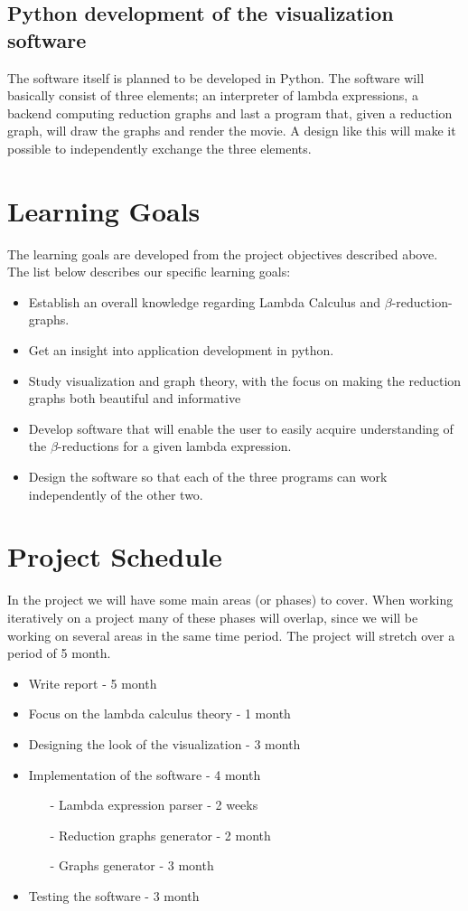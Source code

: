 \documentclass[11pt,oneside,a4paper]{article}
\begin{document}
\subsection{Python development of the visualization software}	
The software itself is planned to be developed in Python. The software will basically consist of three elements; an interpreter of lambda expressions, a backend computing reduction graphs and last a program that, given a reduction graph, will draw the graphs and render the movie. A design like this will make it possible to independently exchange the three elements.

\section{Learning Goals}
The learning goals are developed from the project objectives described above. The list below describes our specific learning goals:
\begin{itemize}
	\item Establish an overall knowledge regarding Lambda Calculus and $\beta$-reduction-graphs.
	\item Get an insight into application development in python.
	\item Study visualization and graph theory, with the focus on making the reduction graphs both beautiful and informative
	\item Develop software that will enable the user to easily acquire understanding of the $\beta$-reductions for a given lambda expression.
	\item Design the software so that each of the three programs can work independently of the other two.
\end{itemize}


\section{Project Schedule}
In the project we will have some main areas (or phases) to cover. When working iteratively on a project many of these phases will overlap, since we will be working on several areas in the same time period. The project will stretch over a period of 5 month.
\begin{itemize}
	\item Write report - 5 month
	\item Focus on the lambda calculus theory - 1 month
	\item Designing the look of the visualization - 3 month
	\item Implementation of the software - 4 month
	\begin{itemize}
		\item[-] Lambda expression parser - 2 weeks
		\item[-] Reduction graphs generator - 2 month
		\item[-] Graphs generator - 3 month
	\end{itemize}
	\item Testing the software - 3 month
\end{itemize}
\end{document}
